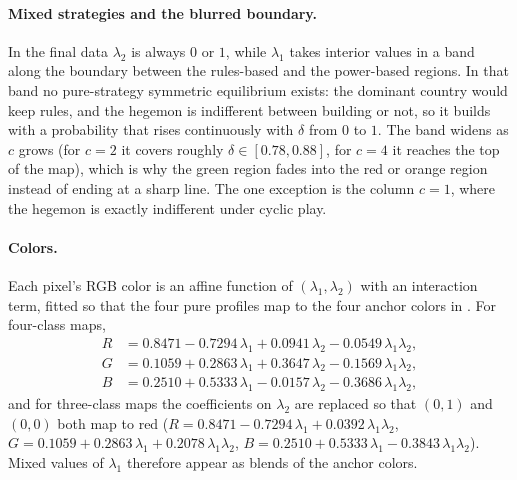 \paragraph*{Mixed strategies and the blurred boundary.}
In the final data $\lambda_2$ is always $0$ or $1$, while $\lambda_1$ takes
interior values in a band along the boundary between the rules-based and
the power-based regions. In that band no pure-strategy symmetric equilibrium
exists: the dominant country would keep rules, and the hegemon is
indifferent between building or not, so it builds with a probability that
rises continuously with $\delta$ from $0$ to $1$. The band widens as $c$
grows (for $c = 2$ it covers roughly $\delta \in [0.78, 0.88]$, for $c = 4$
it reaches the top of the map), which is why the green region fades into the
red or orange region instead of ending at a sharp line. The one exception is
the column $c = 1$, where the hegemon is exactly indifferent under cyclic
play.

\paragraph*{Colors.}
Each pixel's RGB color is an affine function of $(\lambda_1, \lambda_2)$ with
an interaction term, fitted so that the four pure profiles map to the four
anchor colors in . For four-class maps,
\begin{align*}
  R &= 0.8471 - 0.7294\,\lambda_1 + 0.0941\,\lambda_2 - 0.0549\,\lambda_1\lambda_2, \\
  G &= 0.1059 + 0.2863\,\lambda_1 + 0.3647\,\lambda_2 - 0.1569\,\lambda_1\lambda_2, \\
  B &= 0.2510 + 0.5333\,\lambda_1 - 0.0157\,\lambda_2 - 0.3686\,\lambda_1\lambda_2,
\end{align*}
and for three-class maps the coefficients on $\lambda_2$ are replaced so that
$(0, 1)$ and $(0, 0)$ both map to red ($R = 0.8471 - 0.7294\,\lambda_1 +
0.0392\,\lambda_1\lambda_2$, $G = 0.1059 + 0.2863\,\lambda_1 +
0.2078\,\lambda_1\lambda_2$, $B = 0.2510 + 0.5333\,\lambda_1 -
0.3843\,\lambda_1\lambda_2$). Mixed values of $\lambda_1$ therefore appear
as blends of the anchor colors.

